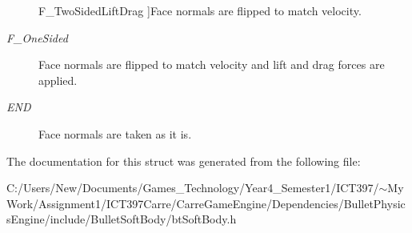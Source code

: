 \begin{Desc}
\begin{description}
{\hypertarget{structbt_soft_body_1_1e_aero_model_147f4e50f7cfaa2855b5ea5b4b2986aebf0ee1be501b9fc3aafd6055c2a54c48}{
F\_\-TwoSidedLiftDrag}
\label{structbt_soft_body_1_1e_aero_model_147f4e50f7cfaa2855b5ea5b4b2986aebf0ee1be501b9fc3aafd6055c2a54c48}
}]Face normals are flipped to match velocity. \item[{\em 
\hypertarget{structbt_soft_body_1_1e_aero_model_147f4e50f7cfaa2855b5ea5b4b2986ae975eb119297b6320316ed0cac16db8e3}{
F\_\-OneSided}
\label{structbt_soft_body_1_1e_aero_model_147f4e50f7cfaa2855b5ea5b4b2986ae975eb119297b6320316ed0cac16db8e3}
}]Face normals are flipped to match velocity and lift and drag forces are applied. \item[{\em 
\hypertarget{structbt_soft_body_1_1e_aero_model_147f4e50f7cfaa2855b5ea5b4b2986ae4b021d138b17f22f5e8fab9a253779f2}{
END}
\label{structbt_soft_body_1_1e_aero_model_147f4e50f7cfaa2855b5ea5b4b2986ae4b021d138b17f22f5e8fab9a253779f2}
}]Face normals are taken as it is. \end{description}
\end{Desc}



The documentation for this struct was generated from the following file:\begin{CompactItemize}
\item 
C:/Users/New/Documents/Games\_\-Technology/Year4\_\-Semester1/ICT397/$\sim$My Work/Assignment1/ICT397Carre/CarreGameEngine/Dependencies/BulletPhysicsEngine/include/BulletSoftBody/btSoftBody.h\end{CompactItemize}
